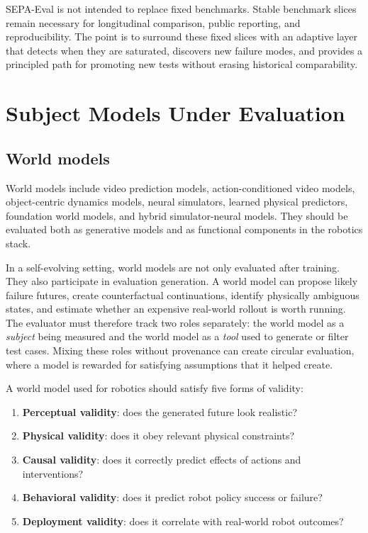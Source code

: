 \documentclass[sigconf,review,anonymous]{acmart}
\newcommand{\system}{SEPA-Eval\xspace}
\begin{document}
\system is not intended to replace fixed benchmarks. Stable benchmark slices remain necessary for longitudinal comparison, public reporting, and reproducibility. The point is to surround these fixed slices with an adaptive layer that detects when they are saturated, discovers new failure modes, and provides a principled path for promoting new tests without erasing historical comparability.

\section{Subject Models Under Evaluation}

\subsection{World models}

World models include video prediction models, action-conditioned video models, object-centric dynamics models, neural simulators, learned physical predictors, foundation world models, and hybrid simulator-neural models. They should be evaluated both as generative models and as functional components in the robotics stack.

In a self-evolving setting, world models are not only evaluated after training. They also participate in evaluation generation. A world model can propose likely failure futures, create counterfactual continuations, identify physically ambiguous states, and estimate whether an expensive real-world rollout is worth running. The evaluator must therefore track two roles separately: the world model as a \emph{subject} being measured and the world model as a \emph{tool} used to generate or filter test cases. Mixing these roles without provenance can create circular evaluation, where a model is rewarded for satisfying assumptions that it helped create.

A world model used for robotics should satisfy five forms of validity:

\begin{enumerate}[leftmargin=*]
  \item \textbf{Perceptual validity}: does the generated future look realistic?
  \item \textbf{Physical validity}: does it obey relevant physical constraints?
  \item \textbf{Causal validity}: does it correctly predict effects of actions and interventions?
  \item \textbf{Behavioral validity}: does it predict robot policy success or failure?
  \item \textbf{Deployment validity}: does it correlate with real-world robot outcomes?
\end{enumerate}
\end{document}
